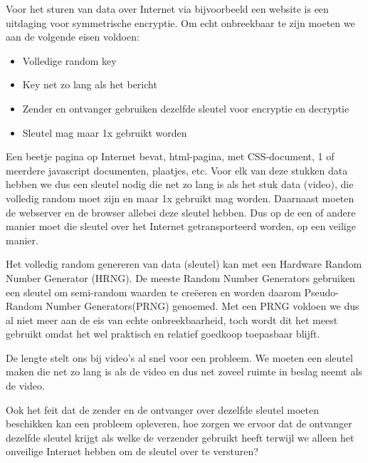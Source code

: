 Voor het sturen van data over Internet via bijvoorbeeld een website is een uitdaging voor symmetrische encryptie. Om echt onbreekbaar te zijn moeten we aan de volgende eisen voldoen:
\begin{itemize}
\item Volledige random key
\item Key net zo lang als het bericht
\item Zender en ontvanger gebruiken dezelfde sleutel voor encryptie en decryptie
\item Sleutel mag maar 1x gebruikt worden
\end{itemize}

Een beetje pagina op Internet bevat, html-pagina, met CSS-document, 1 of meerdere javascript documenten, plaatjes, etc. Voor elk van deze stukken data hebben we dus een sleutel nodig die net zo lang is als het stuk data (video), die volledig random moet zijn en maar 1x gebruikt mag worden. Daarnaast moeten de webserver en de browser allebei deze sleutel hebben. Dus op de een of andere manier moet die sleutel over het Internet getransporteerd worden, op een veilige manier.

Het volledig random genereren van data (sleutel) kan met een Hardware Random Number Generator (HRNG). De meeste Random Number Generators gebruiken een sleutel om semi-random waarden te cre\"eeren en worden daarom Pseudo-Random Number Generators(PRNG) genoemed. Met een PRNG voldoen we dus al niet meer aan de eis van echte onbreekbaarheid, toch wordt dit het meest gebruikt omdat het wel praktisch en relatief goedkoop toepasbaar blijft.

De lengte stelt ons bij video's al snel voor een probleem. We moeten een sleutel maken die net zo lang is als de video en dus net zoveel ruimte in beslag neemt als de video.

Ook het feit dat de zender en de ontvanger over dezelfde sleutel moeten beschikken kan een probleem opleveren, hoe zorgen we ervoor dat de ontvanger dezelfde sleutel krijgt als welke de verzender gebruikt heeft terwijl we alleen het onveilige Internet hebben om de sleutel over te versturen?
